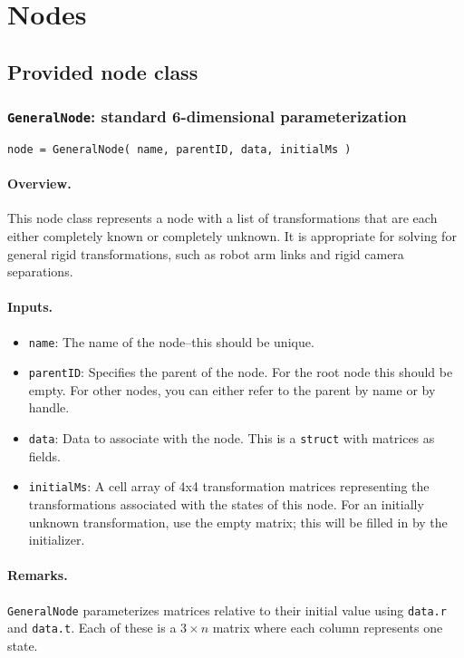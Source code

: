 \section{Nodes}
\label{sec:nodes}

\subsection{Provided node class}

\subsubsection{\texttt{GeneralNode}: standard 6-dimensional parameterization}

\texttt{node = GeneralNode( name, parentID, data, initialMs )}

\paragraph{Overview.} This node class represents a node with a list of transformations that
are each either completely known or completely unknown. It is appropriate for solving for 
general rigid transformations, such as robot arm links and rigid camera separations.

\paragraph{Inputs.}
\begin{itemize}
	\item \texttt{name}: The name of the node--this should be unique.
	\item \texttt{parentID}: Specifies the parent of the node. For the root node this should be empty.
	For other nodes, you can either refer to the parent by name or by handle.
	\item \texttt{data}: Data to associate with the node. This is a \texttt{struct} with matrices
	as fields.
	\item \texttt{initialMs}: A cell array of 4x4 transformation matrices representing the transformations
	associated with the states of this node. For an initially unknown transformation, use the empty matrix;
	this will be filled in by the initializer.
\end{itemize}
\paragraph{Remarks.}
\texttt{GeneralNode} parameterizes matrices relative to their initial value using 
\texttt{data.r} and \texttt{data.t}. Each of these is a $3 \times n$ matrix where each column represents
one state.

